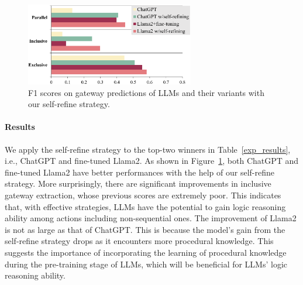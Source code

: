 %
\begin{figure}[t]
    \centering
    \includegraphics[height=3.6cm]{figures/improve.png}

    \caption{F1 scores on gateway predictions of LLMs and their variants with our self-refine strategy.
    }
    \label{fig:improve}

\end{figure}

\phantom{Invisible Text}
\vspace{-\baselineskip}

\paragraph{Results}

We apply the self-refine strategy to the top-two winners in Table~\ref{exp_results}, i.e., ChatGPT and fine-tuned Llama2. As shown in Figure~\ref{fig:improve}, both ChatGPT and fine-tuned Llama2 have better performances with the help of our self-refine strategy. More surprisingly, there are significant improvements in inclusive gateway extraction, whose previous scores are extremely poor. This indicates that, with effective strategies, LLMs have the potential to gain logic reasoning ability among actions including non-sequential ones. The improvement of Llama2 is not as large as that of ChatGPT. This is because the model's gain from the self-refine strategy drops as it encounters more procedural knowledge. This suggests the importance of incorporating the learning of procedural knowledge during the pre-training stage of LLMs, which will be beneficial for LLMs' logic reasoning ability.

